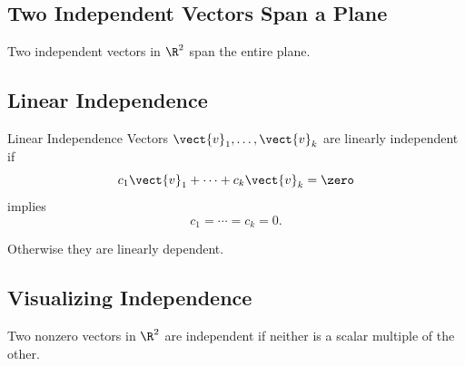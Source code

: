 \subsection{Two Independent Vectors Span a Plane}
\label{subsec:two-vector-span}

Two independent vectors in \(\R^2\) span the entire plane.

\begin{center}
\end{center}

\subsection{Linear Independence}
\label{subsec:linear-independence}

\begin{definitionbox}{Linear Independence}
Vectors \(\vect{v}_1,\ldots,\vect{v}_k\) are linearly independent if
\[ c_1\vect{v}_1+\cdots+c_k\vect{v}_k=\zero \]
implies
\[ c_1=\cdots=c_k=0. \]
\end{definitionbox}

Otherwise they are linearly dependent.

\subsection{Visualizing Independence}
\label{subsec:visualizing-independence}

Two nonzero vectors in \(\R^2\) are independent if neither is a scalar
multiple of the other.

